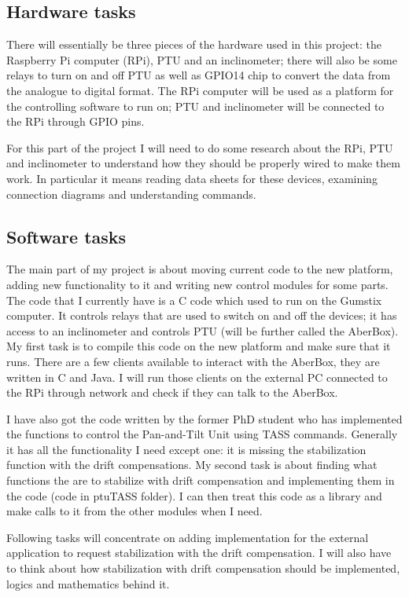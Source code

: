 \documentclass[11pt,fleqn,twoside]{article}
\begin{document}
\subsection{Hardware tasks}
There will essentially be three pieces of the hardware used in this project: the Raspberry Pi computer (RPi), PTU and an inclinometer; there will also be some relays to turn on and off PTU as well as GPIO14 chip to convert the data from the analogue to digital format. The RPi computer will be used as a platform for the controlling software to run on; PTU and inclinometer will be connected to the RPi through GPIO pins. 

For this part of the project I will need to do some research about the RPi, PTU and inclinometer to understand how they should be properly wired to make them work. In particular it means reading data sheets for these devices, examining connection diagrams and understanding commands.

\subsection{Software tasks}
The main part of my project is about moving current code to the new platform, adding new functionality to it and writing new control modules for some parts. The code that I currently have is a C code which used to run on the Gumstix computer. It controls relays that are used to switch on and off the devices; it has access to an inclinometer and controls PTU (will be further called the AberBox). My first task is to compile this code on the new platform and make sure that it runs. There are a few clients available to interact with the AberBox, they are written in C and Java. I will run those clients on the external PC connected to the RPi through network and check if they can talk to the AberBox.  

I have also got the code written by the former PhD student who has implemented the functions to control the Pan-and-Tilt Unit using TASS commands. Generally it has all the functionality I need except one: it is missing the stabilization function with the drift compensations. My second task is about finding what functions the are to stabilize with drift compensation and implementing them in the code (code in ptuTASS folder). I can then treat this code as a library and make calls to it from the other modules when I need.

Following tasks will concentrate on adding implementation for the external application to request stabilization with the drift compensation. I will also have to think about how stabilization with drift compensation should be implemented, logics and mathematics behind it. 
\end{document}
